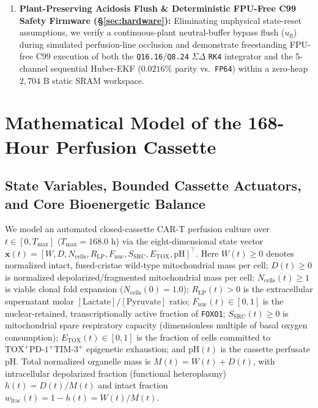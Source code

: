 \documentclass[11pt]{article}
\theoremstyle{plain}
\theoremstyle{remark}
\begin{document}
\begin{enumerate}
  \item \textbf{Plant-Preserving Acidosis Flush \& Deterministic FPU-Free C99 Safety Firmware (\S\ref{sec:hardware}):} Eliminating unphysical state-reset assumptions, we verify a continuous-plant neutral-buffer bypass flush ($u_{\mathrm{fl}}$) during simulated perfusion-line occlusion and demonstrate freestanding FPU-free C99 execution of both the \texttt{Q16.16}/\texttt{Q8.24} $\Sigma\Delta$ \texttt{RK4} integrator and the 5-channel sequential Huber-EKF ($0.0216\%$ parity vs.\ \texttt{FP64}) within a zero-heap $2{,}704\text{ B}$ static SRAM workspace.
\end{enumerate}

\section{Mathematical Model of the 168-Hour Perfusion Cassette}
\label{sec:model}

\subsection{State Variables, Bounded Cassette Actuators, and Core Bioenergetic Balance}
We model an automated closed-cassette CAR-T perfusion culture over $t \in [0, T_{\max}]$ ($T_{\max} = 168.0\text{ h}$) via the eight-dimensional state vector $\mathbf{x}(t) = [W, D, N_{\mathrm{cells}}, R_{\mathrm{LP}}, F_{\mathrm{nuc}}, S_{\mathrm{SRC}}, E_{\mathrm{TOX}}, \mathrm{pH}]^\top$. Here $W(t) \ge 0$ denotes normalized intact, fused-cristae wild-type mitochondrial mass per cell; $D(t) \ge 0$ is normalized depolarized/fragmented mitochondrial mass per cell; $N_{\mathrm{cells}}(t) \ge 1$ is viable clonal fold expansion ($N_{\mathrm{cells}}(0) = 1.0$); $R_{\mathrm{LP}}(t) > 0$ is the extracellular supernatant molar $[\mathrm{Lactate}]/[\mathrm{Pyruvate}]$ ratio; $F_{\mathrm{nuc}}(t) \in [0, 1]$ is the nuclear-retained, transcriptionally active fraction of \texttt{FOXO1}; $S_{\mathrm{SRC}}(t) \ge 0$ is mitochondrial spare respiratory capacity (dimensionless multiple of basal oxygen consumption); $E_{\mathrm{TOX}}(t) \in [0, 1]$ is the fraction of cells committed to $\text{TOX}^+\text{PD-1}^+\text{TIM-3}^+$ epigenetic exhaustion; and $\mathrm{pH}(t)$ is the cassette perfusate pH. Total normalized organelle mass is $M(t) = W(t) + D(t)$, with intracellular depolarized fraction (functional heteroplasmy) $h(t) = D(t)/M(t)$ and intact fraction $w_{\mathrm{frac}}(t) = 1 - h(t) = W(t)/M(t)$.
\end{document}
